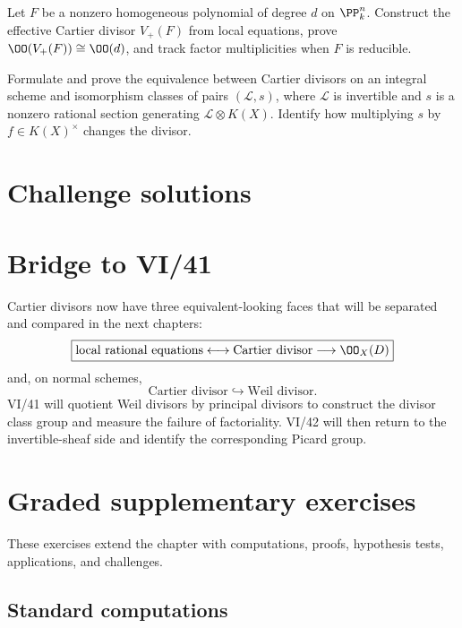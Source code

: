 \begin{problem}\label{chal:vi40-04}
Let \(F\) be a nonzero homogeneous polynomial of degree \(d\) on \(\PP^n_k\).  Construct the effective Cartier divisor \(V_+(F)\) from local equations, prove \(\OO(V_+(F))\cong\OO(d)\), and track factor multiplicities when \(F\) is reducible.
\end{problem}

\begin{problem}\label{chal:vi40-05}
Formulate and prove the equivalence between Cartier divisors on an integral scheme and isomorphism classes of pairs \((\mathcal L,s)\), where \(\mathcal L\) is invertible and \(s\) is a nonzero rational section generating \(\mathcal L\otimes K(X)\).  Identify how multiplying \(s\) by \(f\in K(X)^\times\) changes the divisor.
\end{problem}
\ifdefined\IncludeChallengeSolutions
\section{Challenge solutions}

\fi
\section*{Bridge to VI/41}
Cartier divisors now have three equivalent-looking faces that will be separated and compared in the next chapters:
\[
\boxed{
\text{local rational equations}
\longleftrightarrow
\text{Cartier divisor}
\longrightarrow
\OO_X(D)
}
\]
and, on normal schemes,
\[
\boxed{
\text{Cartier divisor}
\hookrightarrow
\text{Weil divisor}.
}
\]
VI/41 will quotient Weil divisors by principal divisors to construct the divisor class group and measure the failure of factoriality.  VI/42 will then return to the invertible-sheaf side and identify the corresponding Picard group.
\section{Graded supplementary exercises}
These exercises extend the chapter with computations, proofs, hypothesis tests, applications, and challenges.

\subsection*{Standard computations}

